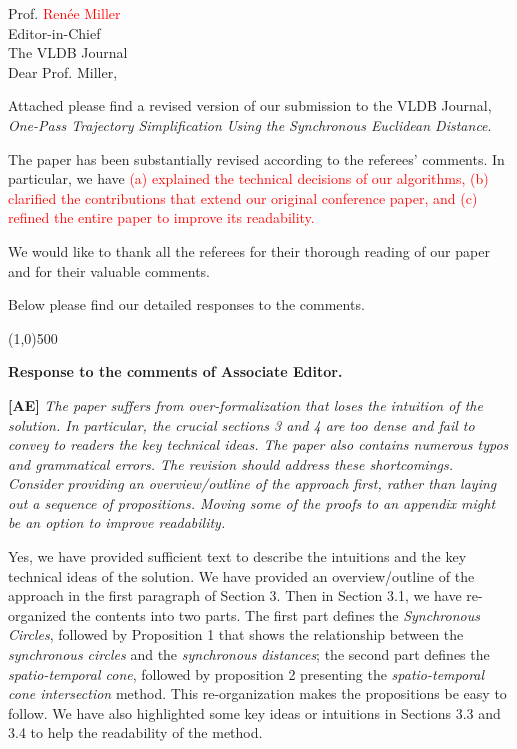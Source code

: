 \documentclass{letter}
\newcommand{\marked}[1]{\textcolor{red}{#1}}
\begin{document}
Prof. \marked{Renée Miller} \\
Editor-in-Chief		\\
The VLDB Journal	\\



Dear Prof. Miller,

Attached please find a revised version of our submission to
the VLDB Journal, \emph{One-Pass Trajectory Simplification Using the Synchronous Euclidean Distance}.


The paper has been substantially revised according to the referees' comments. In particular, we have \marked{ (a) explained the technical decisions of our algorithms, (b) clarified the contributions that extend our original conference paper, and (c) refined the entire paper to improve its readability.}

We would like to thank all the referees for their thorough reading of our paper and for their valuable comments.

Below please find our detailed responses to the comments.


\line(1,0){500}

\textbf{Response to the comments of Associate Editor.}

\textbf{[AE]} \emph{The paper suffers from over-formalization that loses the intuition of the solution. In particular, the crucial sections 3 and 4 are too dense and fail to convey to readers the key technical ideas. The paper also contains numerous typos and grammatical errors. The revision should address these shortcomings. Consider providing an overview/outline of the approach first, rather than laying out a sequence of propositions. Moving some of the proofs to an appendix might be an option to improve readability. }

Yes, we have provided sufficient text to describe the intuitions and the key technical ideas of the solution. We have provided an overview/outline of the approach in the first paragraph of Section 3. Then in Section 3.1, we have re-organized the contents into two parts. The first part defines the \emph{Synchronous Circles}, followed by Proposition 1 that shows the relationship between the \textit{synchronous circles} and the \textit{synchronous distances}; the second part defines the \textit{spatio-temporal cone}, followed by proposition 2 presenting the \textit{spatio-temporal cone intersection} method. This re-organization makes the propositions be easy to follow. We have also highlighted some key ideas or intuitions in Sections 3.3 and 3.4 to help the readability of the method. 
\end{document}
